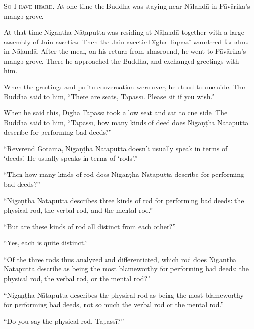 \documentclass[12pt,openany]{book}%
\newcommand*{\scevam}[1]{\textsc{#1}}
\begin{document}
\scevam{So I have heard. }At one time the Buddha was staying near \textsanskrit{Nālandā} in \textsanskrit{Pāvārika}’s mango grove. 

At that time \textsanskrit{Nigaṇṭha} \textsanskrit{Nāṭaputta} was residing at \textsanskrit{Nāḷandā} together with a large assembly of Jain ascetics. Then the Jain ascetic \textsanskrit{Dīgha} \textsanskrit{Tapassī} wandered for alms in \textsanskrit{Nāḷandā}. After the meal, on his return from almsround, he went to \textsanskrit{Pāvārika}’s mango grove. There he approached the Buddha, and exchanged greetings with him. 

When the greetings and polite conversation were over, he stood to one side. The Buddha said to him, “There are seats, \textsanskrit{Tapassī}. Please sit if you wish.” 

When he said this, \textsanskrit{Dīgha} \textsanskrit{Tapassī} took a low seat and sat to one side. The Buddha said to him, “\textsanskrit{Tapassī}, how many kinds of deed does \textsanskrit{Nigaṇṭha} \textsanskrit{Nātaputta} describe for performing bad deeds?” 

“Reverend Gotama, \textsanskrit{Nigaṇṭha} \textsanskrit{Nātaputta} doesn’t usually speak in terms of ‘deeds’. He usually speaks in terms of ‘rods’.” 

“Then how many kinds of rod does \textsanskrit{Nigaṇṭha} \textsanskrit{Nātaputta} describe for performing bad deeds?” 

“\textsanskrit{Nigaṇṭha} \textsanskrit{Nātaputta} describes three kinds of rod for performing bad deeds: the physical rod, the verbal rod, and the mental rod.” 

“But are these kinds of rod all distinct from each other?” 

“Yes, each is quite distinct.” 

“Of the three rods thus analyzed and differentiated, which rod does \textsanskrit{Nigaṇṭha} \textsanskrit{Nātaputta} describe as being the most blameworthy for performing bad deeds: the physical rod, the verbal rod, or the mental rod?” 

“\textsanskrit{Nigaṇṭha} \textsanskrit{Nātaputta} describes the physical rod as being the most blameworthy for performing bad deeds, not so much the verbal rod or the mental rod.” 

“Do you say the physical rod, \textsanskrit{Tapassī}?” 
\end{document}
